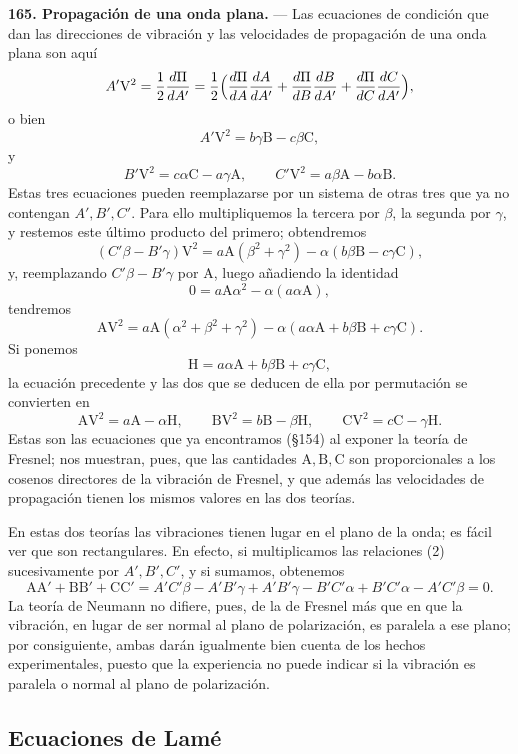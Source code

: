 \noindent\textbf{165. Propagación de una onda plana.} — Las ecuaciones
de condición que dan las direcciones de vibración y las velocidades de
propagación de una onda plana son aquí
\[
A'\mathrm V^2=\frac{1}{2}\frac{d\Pi}{dA'}
=\frac{1}{2}\Bigl(\frac{d\Pi}{dA}\frac{dA}{dA'}+\frac{d\Pi}{dB}\frac{dB}{dA'}+\frac{d\Pi}{dC}\frac{dC}{dA'}\Bigr),
\]
o bien
\[
A'\mathrm V^2=b\gamma \mathrm B-c\beta \mathrm C,
\]
y
\[
B'\mathrm V^2=c\alpha \mathrm C-a\gamma \mathrm A,\qquad
C'\mathrm V^2=a\beta \mathrm A-b\alpha \mathrm B.
\]
Estas tres ecuaciones pueden reemplazarse por un sistema de otras tres que
ya no contengan $A',B',C'$. Para ello multipliquemos la tercera por
$\beta$, la segunda por $\gamma$, y restemos este último producto del
primero; obtendremos
\[
(C'\beta-B'\gamma)\mathrm V^2=a\mathrm A(\beta^2+\gamma^2)-\alpha(b\beta \mathrm B-c\gamma \mathrm C),
\]
y, reemplazando $C'\beta-B'\gamma$ por $\mathrm A$, luego añadiendo la
identidad
\[
0=a\mathrm A\alpha^2-\alpha(a\alpha \mathrm A),
\]
tendremos
\[
\mathrm{A}\mathrm V^2=a\mathrm A(\alpha^2+\beta^2+\gamma^2)-\alpha(a\alpha \mathrm A+b\beta \mathrm B+c\gamma \mathrm C).
\]
Si ponemos
\[
\mathrm H=a\alpha \mathrm A+b\beta \mathrm B+c\gamma \mathrm C,
\]
la ecuación precedente y las dos que se deducen de ella por permutación se
convierten en
\[
\mathrm A\mathrm V^2=a\mathrm A-\alpha \mathrm H,\qquad
\mathrm B\mathrm V^2=b\mathrm B-\beta \mathrm H,\qquad
\mathrm C\mathrm V^2=c\mathrm C-\gamma \mathrm H.
\]
Estas son las ecuaciones que ya encontramos (§154) al exponer la teoría
de Fresnel; nos muestran, pues, que las cantidades $\mathrm A,\mathrm
B,\mathrm C$ son proporcionales a los cosenos directores de la vibración
de Fresnel, y que además las velocidades de propagación tienen los mismos
valores en las dos teorías.

En estas dos teorías las vibraciones tienen lugar en el plano de la onda;
es fácil ver que son rectangulares. En efecto, si multiplicamos las
relaciones (2) sucesivamente por $A',B',C'$, y si sumamos, obtenemos
\[
\mathrm{AA}'+\mathrm{BB}'+\mathrm{CC}'
=A'C'\beta-A'B'\gamma+A'B'\gamma-B'C'\alpha+B'C'\alpha-A'C'\beta=0.
\]
La teoría de Neumann no difiere, pues, de la de Fresnel más que en que la
vibración, en lugar de ser normal al plano de polarización, es paralela a
ese plano; por consiguiente, ambas darán igualmente bien cuenta de los
hechos experimentales, puesto que la experiencia no puede indicar si la
vibración es paralela o normal al plano de polarización.

\subsection{Ecuaciones de Lamé}

